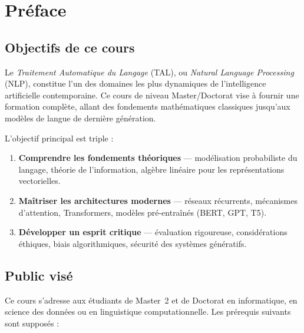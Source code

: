 \chapter*{Pr\'eface}

\section*{Objectifs de ce cours}

Le \emph{Traitement Automatique du Langage} (TAL), ou \emph{Natural Language
Processing} (NLP), constitue l'un des domaines les plus dynamiques de
l'intelligence artificielle contemporaine. Ce cours de niveau Master/Doctorat
vise \`a fournir une formation compl\`ete, allant des fondements math\'ematiques
classiques jusqu'aux mod\`eles de langue de derni\`ere g\'en\'eration.

L'objectif principal est triple :
\begin{enumerate}
    \item \textbf{Comprendre les fondements th\'eoriques} --- mod\'elisation
          probabiliste du langage, th\'eorie de l'information, alg\`ebre
          lin\'eaire pour les repr\'esentations vectorielles.
    \item \textbf{Ma\^itriser les architectures modernes} --- r\'eseaux
          r\'ecurrents, m\'ecanismes d'attention, Transformers, mod\`eles
          pr\'e-entra\^in\'es (BERT, GPT, T5).
    \item \textbf{D\'evelopper un esprit critique} --- \'evaluation rigoureuse,
          consid\'erations \'ethiques, biais algorithmiques, s\'ecurit\'e des
          syst\`emes g\'en\'eratifs.
\end{enumerate}

\section*{Public vis\'e}

Ce cours s'adresse aux \'etudiants de Master~2 et de Doctorat en informatique,
en science des donn\'ees ou en linguistique computationnelle. Les pr\'erequis
suivants sont suppos\'es :

